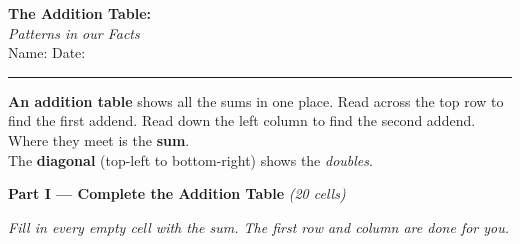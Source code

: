 \documentclass[12pt, letterpaper]{article}
\newcommand{\answerline}{\underline{\hspace{2.5cm}}}
\newcommand{\biganswerline}{\underline{\hspace{4cm}}}
\begin{document}
\begin{center}
  {\LARGE\textbf{\textcolor{scholared}{The Addition Table:}}}\\[4pt]
  {\Large\textcolor{scholagold}{\textit{Patterns in our Facts}}}\\[6pt]
  {\small Name: \biganswerline \hspace{1cm} Date: \answerline}
\end{center}

\vspace{4pt}
\noindent\textcolor{scholared}{\rule{\linewidth}{1pt}}
\vspace{4pt}


\begin{lessonbox}
\textbf{An addition table} shows all the sums in one place.
Read across the top row to find the first addend.
Read down the left column to find the second addend.
Where they meet is the \textbf{sum}.\\[4pt]
\noindent The \textbf{diagonal} (top-left to bottom-right) shows the \emph{doubles}.
\end{lessonbox}

\bigskip

\noindent\textcolor{scholared}{\large\textbf{Part I — Complete the Addition Table}} \hfill \textit{(20 cells)}

\medskip
\noindent\textit{Fill in every empty cell with the sum. The first row and column are done for you.}

\bigskip
\end{document}
